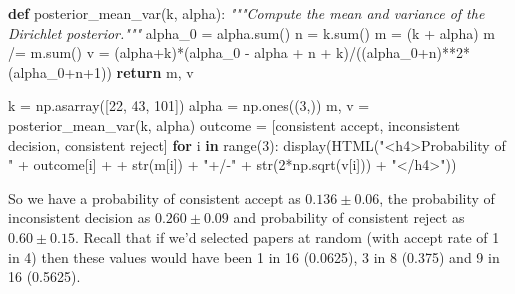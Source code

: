 \documentclass[a4paperpaper,]{article}
\newenvironment{Shaded}{}{}
\newcommand{\BuiltInTok}[1]{#1}
\newcommand{\CommentTok}[1]{\textcolor[rgb]{0.38,0.63,0.69}{\textit{#1}}}
\newcommand{\ControlFlowTok}[1]{\textcolor[rgb]{0.00,0.44,0.13}{\textbf{#1}}}
\newcommand{\DecValTok}[1]{\textcolor[rgb]{0.25,0.63,0.44}{#1}}
\newcommand{\KeywordTok}[1]{\textcolor[rgb]{0.00,0.44,0.13}{\textbf{#1}}}
\newcommand{\NormalTok}[1]{#1}
\newcommand{\OperatorTok}[1]{\textcolor[rgb]{0.40,0.40,0.40}{#1}}
\newcommand{\StringTok}[1]{\textcolor[rgb]{0.25,0.44,0.63}{#1}}
\begin{document}
\begin{Shaded}
\begin{Highlighting}[]
\KeywordTok{def}\NormalTok{ posterior\_mean\_var(k, alpha):}
    \CommentTok{"""Compute the mean and variance of the Dirichlet posterior."""}
\NormalTok{    alpha\_0 }\OperatorTok{=}\NormalTok{ alpha.}\BuiltInTok{sum}\NormalTok{()}
\NormalTok{    n }\OperatorTok{=}\NormalTok{ k.}\BuiltInTok{sum}\NormalTok{()}
\NormalTok{    m }\OperatorTok{=}\NormalTok{ (k }\OperatorTok{+}\NormalTok{ alpha)}
\NormalTok{    m }\OperatorTok{/=}\NormalTok{ m.}\BuiltInTok{sum}\NormalTok{()}
\NormalTok{    v }\OperatorTok{=}\NormalTok{ (alpha}\OperatorTok{+}\NormalTok{k)}\OperatorTok{*}\NormalTok{(alpha\_0 }\OperatorTok{{-}}\NormalTok{ alpha }\OperatorTok{+}\NormalTok{ n }\OperatorTok{+}\NormalTok{ k)}\OperatorTok{/}\NormalTok{((alpha\_0}\OperatorTok{+}\NormalTok{n)}\OperatorTok{**}\DecValTok{2}\OperatorTok{*}\NormalTok{(alpha\_0}\OperatorTok{+}\NormalTok{n}\OperatorTok{+}\DecValTok{1}\NormalTok{))}
    \ControlFlowTok{return}\NormalTok{ m, v}

\NormalTok{k }\OperatorTok{=}\NormalTok{ np.asarray([}\DecValTok{22}\NormalTok{, }\DecValTok{43}\NormalTok{, }\DecValTok{101}\NormalTok{])}
\NormalTok{alpha }\OperatorTok{=}\NormalTok{ np.ones((}\DecValTok{3}\NormalTok{,))}
\NormalTok{m, v }\OperatorTok{=}\NormalTok{ posterior\_mean\_var(k, alpha)}
\NormalTok{outcome }\OperatorTok{=}\NormalTok{ [}\StringTok{\textquotesingle{}consistent accept\textquotesingle{}}\NormalTok{, }\StringTok{\textquotesingle{}inconsistent decision\textquotesingle{}}\NormalTok{, }\StringTok{\textquotesingle{}consistent reject\textquotesingle{}}\NormalTok{]}
\ControlFlowTok{for}\NormalTok{ i }\KeywordTok{in} \BuiltInTok{range}\NormalTok{(}\DecValTok{3}\NormalTok{):}
\NormalTok{    display(HTML(}\StringTok{"\textless{}h4\textgreater{}Probability of "} \OperatorTok{+}\NormalTok{ outcome[i] }\OperatorTok{+}\StringTok{\textquotesingle{} \textquotesingle{}} \OperatorTok{+} \BuiltInTok{str}\NormalTok{(m[i]) }\OperatorTok{+}  \StringTok{"+/{-}"} \OperatorTok{+} \BuiltInTok{str}\NormalTok{(}\DecValTok{2}\OperatorTok{*}\NormalTok{np.sqrt(v[i])) }\OperatorTok{+} \StringTok{"\textless{}/h4\textgreater{}"}\NormalTok{))}
\end{Highlighting}
\end{Shaded}

So we have a probability of consistent accept as \(0.136 \pm 0.06\), the
probability of inconsistent decision as \(0.260 \pm 0.09\) and
probability of consistent reject as \(0.60 \pm 0.15\). Recall that if
we'd selected papers at random (with accept rate of 1 in 4) then these
values would have been 1 in 16 (0.0625), 3 in 8 (0.375) and 9 in 16
(0.5625).
\end{document}
